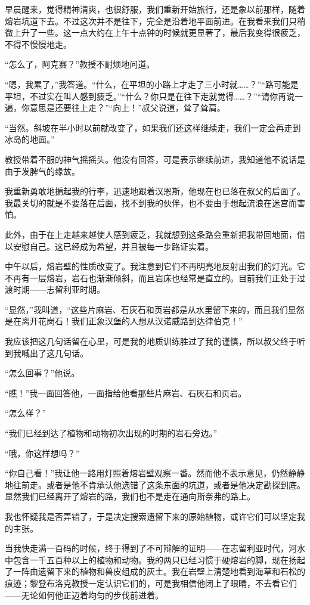 \documentclass[10pt]{book}
\begin{document}
早晨醒来，觉得精神清爽，也很舒服，我们重新开始旅行，还是象以前那样，随着熔岩坑道下去。不过这次并不是往下，完全是沿着地平面前进。在我看来我们只稍微上升了一些。这一点大约在上午十点钟的时候就更显著了，最后我变得很疲乏，不得不慢慢地走。

“怎么了，阿克赛？”教授不耐烦地问道。

“嗯，我累了，”我答道。“什么，在平坦的小路上才走了三小时就……？”“路可能是平坦，不过实在叫人感到疲乏。”“什么？你只是在往下走就觉得……？”“请你再说一遍，你意思是还要往上走？”“向上！”叔父说道，耸了耸肩。

“当然。斜坡在半小时以前就改变了，如果我们还这样继续走，我们一定会再走到冰岛的地面。”

教授带着不服的神气摇摇头。他没有回答，可是表示继续前进，我知道他不说话是由于发脾气的缘故。

我重新勇敢地掮起我的行李，迅速地跟着汉恩斯，他现在也已落在叔父的后面了。我最关切的就是不要落在后面，找不到我的伙伴，也不要由于想起流浪在迷宫而害怕。

此外，由于在上走越来越使人感到疲乏，我就想到这条路会重新把我带回地面，借以安慰自己。这已经成为希望，并且被每一步路证实着。

中午以后，熔岩壁的性质改变了。我注意到它们不再明亮地反射出我们的灯光。它不再有一层熔岩，岩石也渐渐倾斜，而且岩床也经常是直立的。目前我们正处于过渡时期——志留利亚时期。

“显然，”我叫道，“这些片麻岩、石灰石和页岩都是从水里留下来的，而且我们显然是在离开花岗石！我们正象汉堡的人想从汉诺威路到达律伯克！”

我应该把这几句话留在心里，可是我的地质训练胜过了我的谨慎，所以叔父终于听到我喊出了这几句话。

“怎么回事？”他说。

“瞧！”我一面回答他，一面指给他看那些片麻岩、石灰石和页岩。

“怎么样？”

“我们已经到达了植物和动物初次出现的时期的岩石旁边。”

“哦，你这样想吗？”

“你自己看！”我让他一路用灯照着熔岩壁观察一番。然而他不表示意见，仍然静静地往前走。或者是他不肯承认他选错了这条东面的坑道，或者是他决定勘探到底。显然我们已经离开了熔岩的路，我们也不是走在通向斯奈弗的路上。

我也怀疑我是否弄错了，于是决定搜索遗留下来的原始植物，或许它们可以坚定我的主张。

当我快走满一百码的时候，终于得到了不可辩解的证明——在志留利亚时代，河水中包含一千五百种以上的植物和动物。我的两只已经习惯于硬熔岩的脚，现在扬起了一阵由遗留下来的植物和兽皮组成的灰土。我在岩壁上清楚地看到海草和石松的痕迹；黎登布洛克教授一定认识它们的，可是我相信他闭上了眼睛，不去看它们——无论如何他正迈着均匀的步伐前进着。
\end{document}
